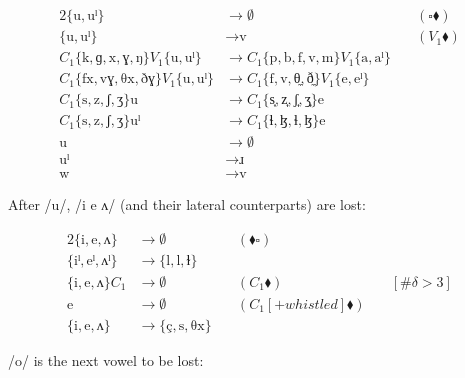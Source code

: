 \documentclass{book}
\begin{document}
\begin{alignat*}{2}
  \{\text{u}, \text{uˡ}\} &\rightarrow \emptyset &\quad(\square \blacklozenge) \\
  \{\text{u}, \text{uˡ}\} &\rightarrow \text{v} &\quad(V_1 \blacklozenge) \\
  C_1\{\text{k}, \text{ɡ}, \text{x}, \text{ɣ}, \text{ŋ}\} V_1\{\text{u}, \text{uˡ}\} &\rightarrow
    C_1\{\text{p}, \text{b}, \text{f}, \text{v}, \text{m}\} V_1\{\text{a}, \text{aˡ}\} \\
  C_1\{\text{fx}, \text{vɣ}, \text{θx}, \text{ðɣ}\} V_1\{\text{u}, \text{uˡ}\} &\rightarrow
    C_1\{\text{f}, \text{v}, \text{θ̼}, \text{ð̼}\} V_1\{\text{e}, \text{eˡ}\} \\
  C_1\{\text{s}, \text{z}, \text{ʃ}, \text{ʒ}\} \text{u} &\rightarrow
    C_1\{\text{s͎}, \text{z͎}, \text{ʃ͎}, \text{ʒ͎}\} \text{e} \\
  C_1\{\text{s}, \text{z}, \text{ʃ}, \text{ʒ}\} \text{uˡ} &\rightarrow
    C_1\{\text{ɬ}, \text{ɮ}, \text{ɬ}, \text{ɮ}\} \text{e} \\
  \text{u} &\rightarrow \emptyset \\
  \text{uˡ} &\rightarrow \text{ɹ} \\
  \text{w} &\rightarrow \text{v}
\end{alignat*}

After /u/, /i e ʌ/ (and their lateral counterparts) are lost:

\begin{alignat*}{2}
  \{\text{i}, \text{e}, \text{ʌ}\} &\rightarrow
    \emptyset &\quad(\blacklozenge \square) \\
  \{\text{iˡ}, \text{eˡ}, \text{ʌˡ}\} &\rightarrow
    \{\text{l}, \text{l}, \text{ɫ}\} \\
  \{\text{i}, \text{e}, \text{ʌ}\} C_1 &\rightarrow
    \emptyset &\quad(C_1 \blacklozenge) &\quad[\#\delta > 3] \\
  \text{e} &\rightarrow \emptyset &\quad(C_1[+whistled] \blacklozenge) \\
  \{\text{i}, \text{e}, \text{ʌ}\} &\rightarrow
    \{\text{ç}, \text{s}, \text{θx}\}
\end{alignat*}

/o/ is the next vowel to be lost:
\end{document}
